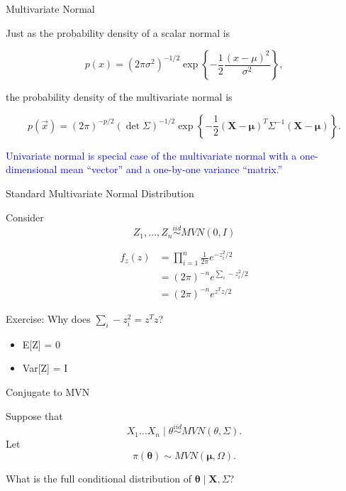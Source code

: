\documentclass[ignorenonframetext,]{beamer}
\providecommand{\tightlist}{%
  \setlength{\itemsep}{0pt}\setlength{\parskip}{0pt}}
\newcommand{\btheta}{{\bm\theta}}
\newcommand{\bmu}{\bm{\mu}}
\newcommand{\bX}   {\bm{X}}
\newcommand{\bx}{\ensuremath{\mathbf{X}}}
\begin{document}
\begin{frame}{Multivariate Normal}

Just as the probability density of a scalar normal is

\begin{equation}
p(x) = {\left(2\pi\sigma^2\right)}^{-1/2}\exp{\left\{ -\frac{1}{2} \frac{(x-\mu)^2}{\sigma^2}\right\}},
\end{equation}

the probability density of the multivariate normal is

\begin{equation}
p(\vec{x}) = {\left(2\pi\right)}^{-p/2}(\det{\Sigma})^{-1/2} \exp{\left\{-\frac{1}{2} (\bx-\bmu)^T\Sigma^{-1} (\bx - \bmu)\right\}}.
\end{equation}

\textcolor{blue}{Univariate normal is special case of the multivariate normal with a one-dimensional mean ``vector'' and a one-by-one variance ``matrix.''}

\end{frame}

\begin{frame}{Standard Multivariate Normal Distribution}

Consider \[Z_1,\ldots,Z_n \stackrel{iid}{\sim} MVN(0,I)\]

\begin{align}
f_z(z) &= \prod_{i=1}^n \frac{1}{2\pi} e^{-z_i^2/2}\\
& = (2\pi)^{-n} e^{\sum_i-z_i^2/2}\\
& = (2\pi)^{-n} e^{z^Tz/2}
\end{align}

Exercise: Why does \(\sum_i-z_i^2 = z^Tz\)?

\begin{itemize}
\tightlist
\item
  E{[}Z{]} = 0
\item
  Var{[}Z{]} = I
\end{itemize}

\end{frame}

\begin{frame}{Conjugate to MVN}

Suppose that
\[X_1 \ldots X_n \mid \theta \stackrel{iid}{\sim} MVN(\theta, \Sigma). \]
Let \[\pi(\btheta) \sim MVN(\bmu, \Omega). \]

What is the full conditional distribution of
\(\btheta \mid \bX, \Sigma\)?

\end{frame}
\end{document}
